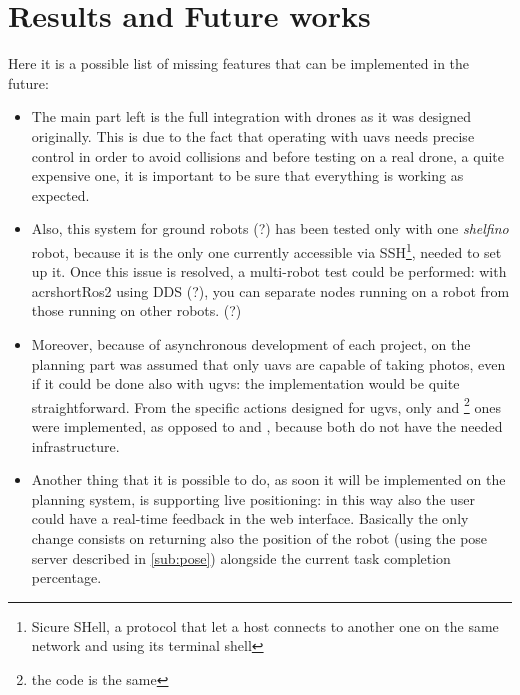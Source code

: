 \chapter{Results and Future works}
\label{cha:futureworks} %

Here it is a possible list of missing features that can be implemented in the future:

\begin{itemize}

\item The main part left is the full integration with drones as it was designed originally. This is due to the fact that operating with \acrshort{uav}s needs precise control in order to avoid collisions and before testing on a real drone, a quite expensive one, it is important to be sure that everything is working as expected.

\item Also, this system for ground robots (?) has been tested only with one \textit{shelfino} robot, because it is the only one currently accessible via SSH\footnote{Sicure SHell, a protocol that let a host connects to another one on the same network and using its terminal shell}, needed to set up it. Once this issue is resolved, a multi-robot test could be performed: with acrshort{Ros}2 using DDS (?), you can separate nodes running on a robot from those running on other robots. (?) %

\item Moreover, because of asynchronous development of each project, on the planning part was assumed that only \acrshort{uav}s are capable of taking photos, even if it could be done also with \acrshort{ugv}s: the implementation would be quite straightforward. From the specific actions designed for \acrshort{ugv}s, only  and \footnote{the code is the same} ones were implemented, as opposed to  and , because both do not have the needed infrastructure.

\item Another thing that it is possible to do, as soon it will be implemented on the planning system, is supporting live positioning: in this way also the user could have a real-time feedback in the web interface. Basically the only change consists on returning also the position of the robot (using the pose server described in \autoref{sub:pose}) alongside the current task completion percentage.


\end{itemize}
